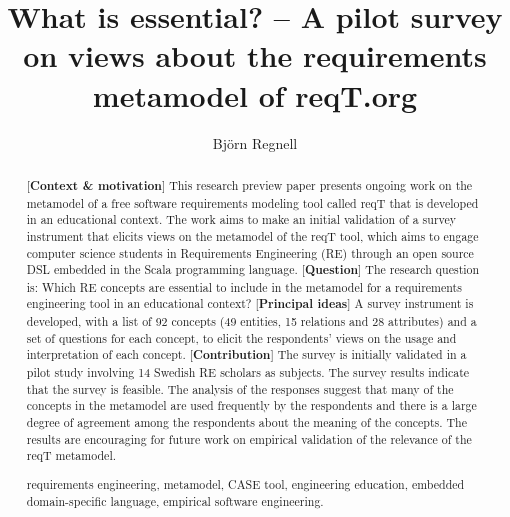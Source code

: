 \documentclass[a4paper]{llncs}
\newcommand{\keywords}[1]{\par\addvspace\baselineskip
\noindent\keywordname\enspace\ignorespaces#1}
\begin{document}

\mainmatter  %

\title{What is essential? -- A pilot survey on views about the requirements metamodel of reqT.org}

\author{Bj\"orn Regnell}
%


\maketitle

\begin{abstract}
[{\bf Context \& motivation}] This research preview paper presents ongoing work on the metamodel of a free software requirements modeling tool called reqT that is developed in an educational context. The work aims to make an initial validation of a survey instrument that elicits views on the metamodel of the reqT tool, which aims to engage computer science students in Requirements Engineering (RE) through an open source DSL embedded in the Scala programming language. [{\bf Question}] The research question is: Which RE concepts are essential to include in the metamodel for a requirements engineering tool in an educational context?  [{\bf Principal ideas}] A survey instrument is developed, with a list of 92 concepts (49 entities, 15 relations and 28 attributes) and a set of questions for each concept, to elicit the respondents' views on the usage and interpretation of each concept.  [{\bf Contribution}] The survey is initially validated in a pilot study involving 14 Swedish RE scholars as subjects. The survey results indicate that the survey is feasible. The analysis of the responses suggest that many of the concepts in the metamodel are used frequently by the respondents and there is a large degree of agreement among the respondents about the meaning of the concepts. The results are encouraging for future work on empirical validation of the relevance of the reqT metamodel. 

\keywords{requirements engineering, metamodel, CASE tool, engineering education, embedded domain-specific language, empirical software engineering.}
\end{abstract}
\end{document}
